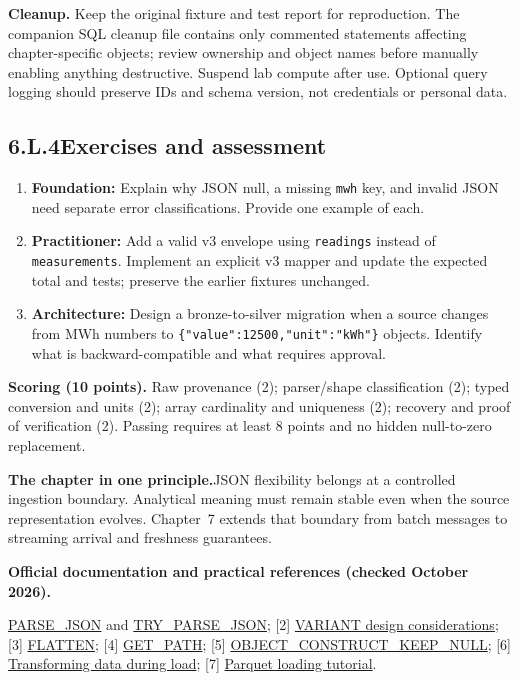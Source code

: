 \documentclass[11pt,twoside]{article}
\newcommand{\topic}[2]{\subsection*{#1\quad #2}}
\begin{document}
\textbf{Cleanup.} Keep the original fixture and test report for reproduction. The companion SQL cleanup file contains only commented statements affecting chapter-specific objects; review ownership and object names before manually enabling anything destructive. Suspend lab compute after use. Optional query logging should preserve IDs and schema version, not credentials or personal data.

\topic{6.L.4}{Exercises and assessment}
\begin{enumerate}
\item \textbf{Foundation:} Explain why JSON null, a missing \texttt{mwh} key, and invalid JSON need separate error classifications. Provide one example of each.
\item \textbf{Practitioner:} Add a valid v3 envelope using \texttt{readings} instead of \texttt{measurements}. Implement an explicit v3 mapper and update the expected total and tests; preserve the earlier fixtures unchanged.
\item \textbf{Architecture:} Design a bronze-to-silver migration when a source changes from MWh numbers to \texttt{\{"value":12500,"unit":"kWh"\}} objects. Identify what is backward-compatible and what requires approval.
\end{enumerate}
\textbf{Scoring (10 points).} Raw provenance (2); parser/shape classification (2); typed conversion and units (2); array cardinality and uniqueness (2); recovery and proof of verification (2). Passing requires at least 8 points and no hidden null-to-zero replacement.

\begin{insight}\textbf{The chapter in one principle.}\quad JSON flexibility belongs at a controlled ingestion boundary. Analytical meaning must remain stable even when the source representation evolves. Chapter~7 extends that boundary from batch messages to streaming arrival and freshness guarantees.\end{insight}
{\fontsize{7.8}{9.6}\selectfont\textbf{Official documentation and practical references (checked October 2026).}\par
[1] \href{https://docs.snowflake.com/en/sql-reference/functions/parse_json}{PARSE\_JSON} and \href{https://docs.snowflake.com/en/sql-reference/functions/try_parse_json}{TRY\_PARSE\_JSON};
[2] \href{https://docs.snowflake.com/en/user-guide/semistructured-considerations}{VARIANT design considerations};
[3] \href{https://docs.snowflake.com/en/sql-reference/functions/flatten}{FLATTEN};
[4] \href{https://docs.snowflake.com/en/sql-reference/functions/get_path}{GET\_PATH};
[5] \href{https://docs.snowflake.com/en/sql-reference/functions/object_construct_keep_null}{OBJECT\_CONSTRUCT\_KEEP\_NULL};
[6] \href{https://docs.snowflake.com/en/user-guide/data-load-transform}{Transforming data during load};
[7] \href{https://docs.snowflake.com/en/en/user-guide/tutorials/script-data-load-transform-parquet}{Parquet loading tutorial}.
}
\end{document}
